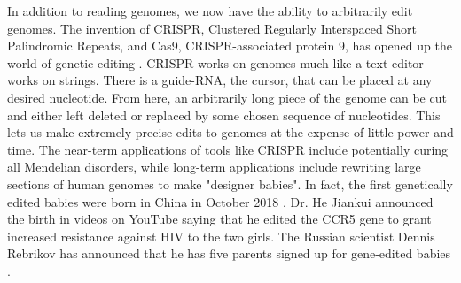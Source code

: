 In addition to reading genomes, we now have the ability to arbitrarily edit genomes.
The invention of CRISPR, Clustered Regularly Interspaced Short Palindromic Repeats, and Cas9, CRISPR-associated protein 9, has opened up the world of genetic editing \cite{Zhang2014}.
CRISPR works on genomes much like a text editor works on strings.
There is a guide-RNA, the cursor, that can be placed at any desired nucleotide.
From here, an arbitrarily long piece of the genome can be cut and either left deleted or replaced by some chosen sequence of nucleotides.
This lets us make extremely precise edits to genomes at the expense of little power and time.
The near-term applications of tools like CRISPR include potentially curing all Mendelian disorders, while long-term applications include rewriting large sections of human genomes to make "designer babies".
In fact, the first genetically edited babies were born in China in October 2018 \cite{crisprbabies2018}.
Dr. He Jiankui announced the birth in videos on YouTube saying that he edited the CCR5 gene to grant increased resistance against HIV to the two girls.
The Russian scientist Dennis Rebrikov has announced that he has five parents signed up for gene-edited babies \cite{Cohen2019}.

